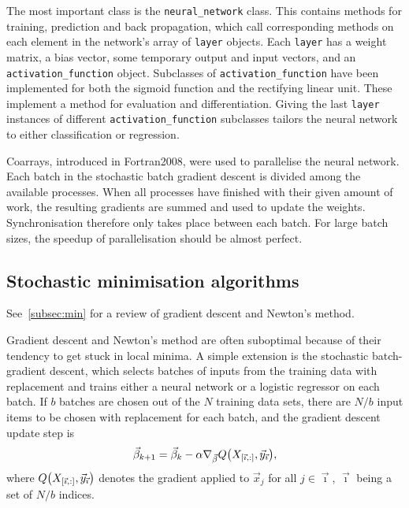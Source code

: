 \documentclass[11pt,british,a4paper]{article}
\numberwithin{equation}{section}
\begin{document}
The most important class is the \lstinline{neural_network} class. This contains methods for training, prediction and back propagation, which call corresponding methods on each element in the network's array of \lstinline{layer} objects. Each \lstinline{layer} has a weight matrix, a bias vector, some temporary output and input vectors, and an \lstinline{activation_function} object. Subclasses of \lstinline{activation_function} have been implemented for both the sigmoid function and the rectifying linear unit. These implement a method for evaluation and differentiation. Giving the last \lstinline{layer} instances of different \lstinline{activation_function} subclasses tailors the neural network to either classification or regression.

Coarrays, introduced in Fortran2008, were used to parallelise the neural network. Each batch in the stochastic batch gradient descent is divided among the available processes. When all processes have finished with their given amount of work, the resulting gradients are summed and used to update the weights. Synchronisation therefore only takes place between each batch. For large batch sizes, the speedup of parallelisation should be almost perfect.


\subsection{Stochastic minimisation algorithms}
See~\vref{subsec:min} for a review of gradient descent and Newton's method.

Gradient descent and Newton's method are often suboptimal because of their tendency to get stuck in local minima.
A simple extension is the stochastic batch-gradient descent, which selects batches of inputs from the training data with replacement and trains either a neural network or a logistic regressor on each batch. If \(b\) batches are chosen out of the \(N\) training data sets, there are \(N/b\) input items to be chosen with replacement for each batch, and the gradient descent update step is
\begin{equation}
    \vec{\beta}_{k+1} = \vec{\beta}_k - \alpha \nabla_{\vec{\beta}} Q\qty(X_{\qty[\vec{\imath},:]},\vec{y}_{\vec{\imath}}),
\end{equation}
where \(Q\qty(X_{\qty[\vec{\imath},:]},\vec{y}_{\vec{\imath}})\) denotes the gradient applied to \(\vec{x}_j\) for all \(j\in\vec{\imath}\), \(\vec{\imath}\) being a set of \(N/b\) indices.
\end{document}
